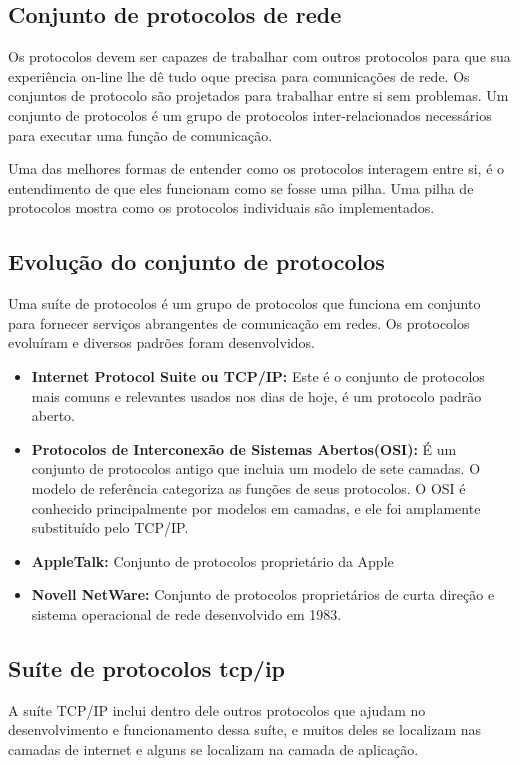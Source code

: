 \documentclass[12pt a4paper]{paper}
\begin{document}
\subsection{Conjunto de protocolos de rede} %
\label{sub:Conjunto de protocolos de rede}
Os protocolos devem ser capazes de trabalhar com outros protocolos para que sua 
experiência on-line lhe dê tudo oque precisa para comunicações de rede. Os conjuntos 
de protocolo são projetados para trabalhar entre si sem problemas. Um conjunto de 
protocolos é um grupo de protocolos inter-relacionados necessários para executar uma 
função de comunicação. 

Uma das melhores formas de entender como os protocolos interagem entre si, é o 
entendimento de que eles funcionam como se fosse uma pilha. Uma pilha de protocolos 
mostra como os protocolos individuais são implementados.

\subsection{Evolução do conjunto de protocolos} %
\label{sub:Evolução do conjunto de protocolos}
Uma suíte de protocolos é um grupo de protocolos que funciona em conjunto para fornecer
serviços abrangentes de comunicação em redes. Os protocolos evoluíram e diversos 
padrões foram desenvolvidos. 

\begin{itemize}
  \item \textbf{Internet Protocol Suite ou TCP/IP: } Este é o conjunto de protocolos mais comuns e relevantes usados nos dias de hoje, é um protocolo padrão aberto. 
  \item \textbf{Protocolos de Interconexão de Sistemas Abertos(OSI): }É um conjunto de protocolos antigo que incluia um modelo de sete camadas. O modelo de referência categoriza as funções de seus protocolos. O OSI é conhecido principalmente por modelos em camadas, e ele foi amplamente substituído pelo TCP/IP. 
  \item \textbf{AppleTalk: }Conjunto de protocolos proprietário da Apple
  \item \textbf{Novell NetWare: }Conjunto de protocolos proprietários de curta direção e sistema operacional de rede desenvolvido em 1983.
\end{itemize}

\subsection{Suíte de protocolos tcp/ip} %
\label{sub:Suíte de protocolos tcp/ip}
A suíte TCP/IP inclui dentro dele outros protocolos que 
ajudam no desenvolvimento e funcionamento dessa suíte,
e muitos deles se localizam nas camadas de internet e 
alguns se localizam na camada de aplicação.
\end{document}
